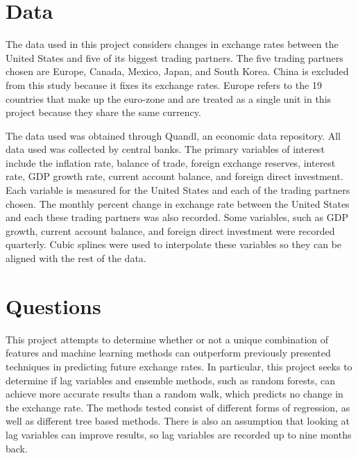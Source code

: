 \documentclass{sig-alternate-05-2015}
\begin{document}
\section{Data}
The data used in this project considers changes in exchange rates between the United States and five of its biggest trading partners. The five trading partners chosen are Europe, Canada, Mexico, Japan, and South Korea. China is excluded from this study because it fixes its exchange rates. Europe refers to the 19 countries that make up the euro-zone and are treated as a single unit in this project because they share the same currency.
\par{} The data used was obtained through Quandl, an economic data repository. All data used was collected by central banks. The primary variables of interest include the inflation rate, balance of trade, foreign exchange reserves, interest rate, GDP growth rate, current account balance, and foreign direct investment. Each variable is measured for the United States and each of the trading partners chosen. The monthly percent change in exchange rate between the United States and each these trading partners was also recorded. Some variables, such as GDP growth, current account balance, and foreign direct investment were recorded quarterly. Cubic splines were used to interpolate these variables so they can be aligned with the rest of the data.  

\section{Questions}
This project attempts to determine whether or not a unique combination of features and machine learning methods can outperform previously presented techniques in predicting future exchange rates. In particular, this project seeks to determine if lag variables and ensemble methods, such as random forests, can achieve more accurate results than a random walk, which predicts no change in the exchange rate. The methods tested consist of different forms of regression, as well as different tree based methods. There is also an assumption that looking at lag variables can improve results, so lag variables are recorded up to nine months back.    
\end{document}
